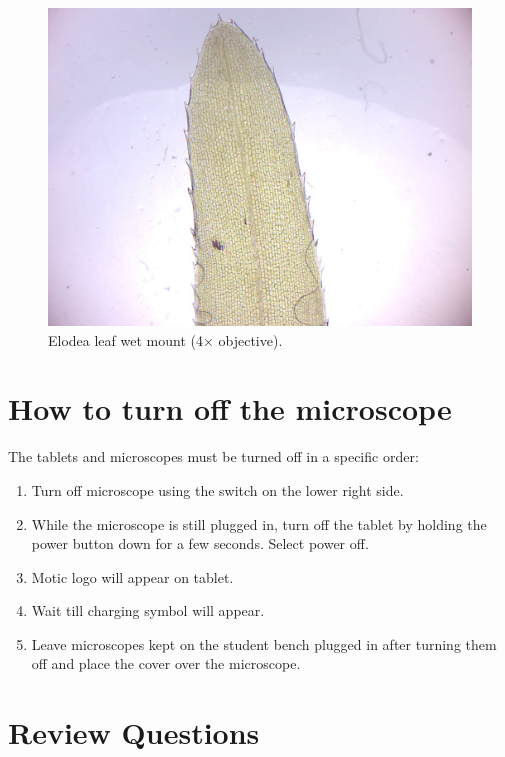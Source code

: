 \begin{figure}

{\centering \includegraphics[width=0.7\linewidth]{./figures/microscope/elodea_leaf} 

}

\caption{Elodea leaf wet mount (4× objective).}\label{fig:elodea}
\end{figure}

\hypertarget{how-to-turn-off-the-microscope}{%
\section{How to turn off the microscope}\label{how-to-turn-off-the-microscope}}

The tablets and microscopes must be turned off in a specific order:

\begin{enumerate}
\def\labelenumi{\arabic{enumi}.}
\tightlist
\item
  Turn off microscope using the switch on the lower right side.
\item
  While the microscope is still plugged in, turn off the tablet by holding the power button down for a few seconds. Select power off.
\item
  Motic logo will appear on tablet.
\item
  Wait till charging symbol will appear.
\item
  Leave microscopes kept on the student bench plugged in after turning them off and place the cover over the microscope.
\end{enumerate}

\hypertarget{review-questions}{%
\section{Review Questions}\label{review-questions}}

